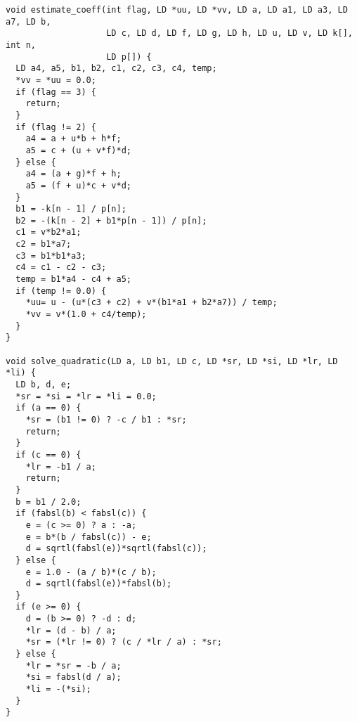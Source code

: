 \begin{lstlisting}
void estimate_coeff(int flag, LD *uu, LD *vv, LD a, LD a1, LD a3, LD a7, LD b,
                    LD c, LD d, LD f, LD g, LD h, LD u, LD v, LD k[], int n,
                    LD p[]) {
  LD a4, a5, b1, b2, c1, c2, c3, c4, temp;
  *vv = *uu = 0.0;
  if (flag == 3) {
    return;
  }
  if (flag != 2) {
    a4 = a + u*b + h*f;
    a5 = c + (u + v*f)*d;
  } else {
    a4 = (a + g)*f + h;
    a5 = (f + u)*c + v*d;
  }
  b1 = -k[n - 1] / p[n];
  b2 = -(k[n - 2] + b1*p[n - 1]) / p[n];
  c1 = v*b2*a1;
  c2 = b1*a7;
  c3 = b1*b1*a3;
  c4 = c1 - c2 - c3;
  temp = b1*a4 - c4 + a5;
  if (temp != 0.0) {
    *uu= u - (u*(c3 + c2) + v*(b1*a1 + b2*a7)) / temp;
    *vv = v*(1.0 + c4/temp);
  }
}

void solve_quadratic(LD a, LD b1, LD c, LD *sr, LD *si, LD *lr, LD *li) {
  LD b, d, e;
  *sr = *si = *lr = *li = 0.0;
  if (a == 0) {
    *sr = (b1 != 0) ? -c / b1 : *sr;
    return;
  }
  if (c == 0) {
    *lr = -b1 / a;
    return;
  }
  b = b1 / 2.0;
  if (fabsl(b) < fabsl(c)) {
    e = (c >= 0) ? a : -a;
    e = b*(b / fabsl(c)) - e;
    d = sqrtl(fabsl(e))*sqrtl(fabsl(c));
  } else {
    e = 1.0 - (a / b)*(c / b);
    d = sqrtl(fabsl(e))*fabsl(b);
  }
  if (e >= 0) {
    d = (b >= 0) ? -d : d;
    *lr = (d - b) / a;
    *sr = (*lr != 0) ? (c / *lr / a) : *sr;
  } else {
    *lr = *sr = -b / a;
    *si = fabsl(d / a);
    *li = -(*si);
  }
}


\end{lstlisting}
